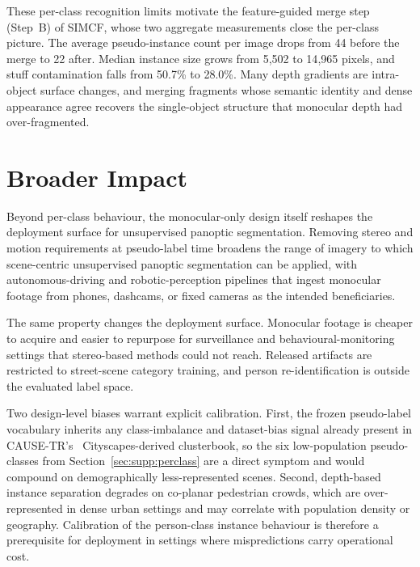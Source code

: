 \documentclass{article}
\begin{document}
These per-class recognition limits motivate the feature-guided merge step (Step~B) of SIMCF, whose two aggregate measurements close the per-class picture. The average pseudo-instance count per image drops from 44 before the merge to 22 after. Median instance size grows from 5{,}502 to 14{,}965 pixels, and stuff contamination falls from 50.7\% to 28.0\%. Many depth gradients are intra-object surface changes, and merging fragments whose semantic identity and dense appearance agree recovers the single-object structure that monocular depth had over-fragmented.

\section{Broader Impact}
\label{sec:impact}

\noindent Beyond per-class behaviour, the monocular-only design itself reshapes the deployment surface for unsupervised panoptic segmentation. Removing stereo and motion requirements at pseudo-label time broadens the range of imagery to which scene-centric unsupervised panoptic segmentation can be applied, with autonomous-driving and robotic-perception pipelines that ingest monocular footage from phones, dashcams, or fixed cameras as the intended beneficiaries.

The same property changes the deployment surface. Monocular footage is cheaper to acquire and easier to repurpose for surveillance and behavioural-monitoring settings that stereo-based methods could not reach. Released artifacts are restricted to street-scene category training, and person re-identification is outside the evaluated label space.

Two design-level biases warrant explicit calibration. First, the frozen pseudo-label vocabulary inherits any class-imbalance and dataset-bias signal already present in CAUSE-TR's~\cite{kim2024cause} Cityscapes-derived clusterbook, so the six low-population pseudo-classes from Section~\ref{sec:supp:perclass} are a direct symptom and would compound on demographically less-represented scenes. Second, depth-based instance separation degrades on co-planar pedestrian crowds, which are over-represented in dense urban settings and may correlate with population density or geography. Calibration of the person-class instance behaviour is therefore a prerequisite for deployment in settings where mispredictions carry operational cost.
\end{document}
